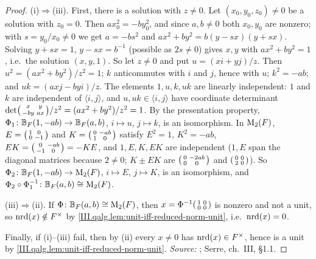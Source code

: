 \begin{proof}
(i)$\Rightarrow$(iii). First, there is a solution with $z\ne0$. Let $(x_0,y_0,z_0)\ne0$ be a solution with $z_0=0$. Then $ax_0^2=-by_0^2$, and
since $a,b\ne0$ both $x_0,y_0$ are nonzero; with $s=y_0/x_0\ne0$ we get $a=-bs^2$ and $ax^2+by^2=b(y-sx)(y+sx)$. Solving $y+sx=1$,
$y-sx=b^{-1}$ (possible as $2s\ne0$) gives $x,y$ with $ax^2+by^2=1$, i.e.\ the solution $(x,y,1)$.
So let $z\ne0$ and put $u=(xi+yj)/z$. Then $u^2=(ax^2+by^2)/z^2=1$; $k$ anticommutes with $i$ and $j$, hence with $u$; $k^2=-ab$; and
$uk=(axj-byi)/z$. The elements $1,u,k,uk$ are linearly independent: $1$ and $k$ are independent of $\langle i,j\rangle$, and $u,uk\in\langle i,j\rangle$
have coordinate determinant $\det\begin{psmallmatrix}x&y\\-by&ax\end{psmallmatrix}/z^2=(ax^2+by^2)/z^2=1$. By the presentation property,
$\Phi_1\colon\mathbb{B}_F(1,-ab)\to\mathbb{B}_F(a,b)$, $i\mapsto u$, $j\mapsto k$, is an isomorphism. In $\mathrm{M}_2(F)$, $E=\begin{psmallmatrix}1&0\\0&-1\end{psmallmatrix}$
and $K=\begin{psmallmatrix}0&-ab\\1&0\end{psmallmatrix}$ satisfy $E^2=1$, $K^2=-ab$, $EK=\begin{psmallmatrix}0&-ab\\-1&0\end{psmallmatrix}=-KE$, and
$1,E,K,EK$ are independent ($1,E$ span the diagonal matrices because $2\ne0$; $K\pm EK$ are $\begin{psmallmatrix}0&-2ab\\0&0\end{psmallmatrix}$ and
$\begin{psmallmatrix}0&0\\2&0\end{psmallmatrix}$). So $\Phi_2\colon\mathbb{B}_F(1,-ab)\to\mathrm{M}_2(F)$, $i\mapsto E$, $j\mapsto K$, is an isomorphism, and
$\Phi_2\circ\Phi_1^{-1}\colon\mathbb{B}_F(a,b)\cong\mathrm{M}_2(F)$.

(iii)$\Rightarrow$(ii). If $\Phi\colon\mathbb{B}_F(a,b)\cong\mathrm{M}_2(F)$, then $x=\Phi^{-1}\begin{psmallmatrix}1&0\\0&0\end{psmallmatrix}$ is nonzero and not a unit,
so $\operatorname{nrd}(x)\notin F^\times$ by \cref{III.qalg.lem:unit-iff-reduced-norm-unit}, i.e.\ $\operatorname{nrd}(x)=0$.

Finally, if (i)--(iii) fail, then by (ii) every $x\ne0$ has $\operatorname{nrd}(x)\in F^\times$, hence is a unit by \cref{III.qalg.lem:unit-iff-reduced-norm-unit}.
\emph{Source:} \cite[§5.4]{Voi}; Serre, ch.~III, §1.1.
\end{proof}

